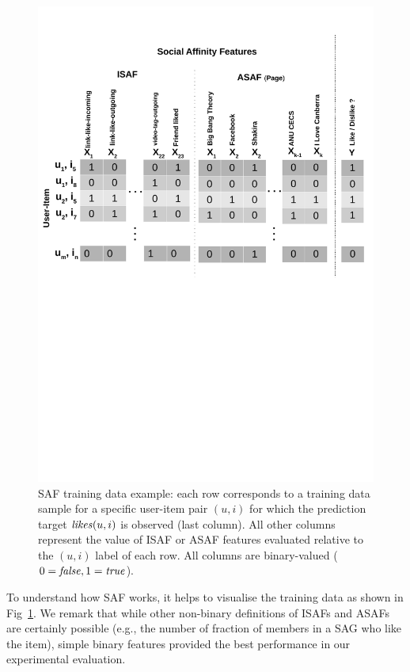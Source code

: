 \begin{figure}[t!]
\centering
\includegraphics[width=1\linewidth]{data/plots/features/saf_features}
\caption{SAF training data example: each row corresponds to a training
  data sample for a specific user-item pair $(u,i)$ for which the
  prediction target $\like(u,i)$ is observed (last column).  All other
  columns represent the value of ISAF or ASAF features
  evaluated relative to the $(u,i)$ label of each row.
  All columns are binary-valued ($0=\false,1=\true$).}
\label{fig:features_overview}
\end{figure}

To understand how SAF works, it helps to visualise the training data as shown
in Fig~\ref{fig:features_overview}.  We remark that while other
non-binary definitions of ISAFs and ASAFs are certainly possible
(e.g., the number of fraction of members in a SAG who like the item),
simple binary features provided the best performance in our
experimental evaluation.

